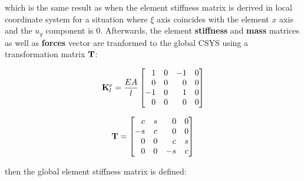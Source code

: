 which is the same result as when the element stiffness matrix is derived
in local coordinate system for a situation where $ \xi $ axis coincides with
the element $ x $ axis and the $ u_y $ component is $ 0 $. Afterwards,
the element \textbf{stiffness} and \textbf{mass} matrices as well as
\textbf{forces} vector are tranformed to the global CSYS using a transformation
matrix $ \mathbf{T} $:

\begin{equation}
    \mathbf{K}_l^e = \frac{EA}{l}
    \begin{bmatrix}
        \phantom{-}1 & 0 & -1 & 0 \\
        \phantom{-}0 & 0 & \phantom{-}0 & 0 \\
        -1 & 0 & \phantom{-}1 & 0 \\
        \phantom{-}0 & 0 & \phantom{-}0 & 0 \\
    \end{bmatrix}
\end{equation}

\begin{equation}
    \mathbf{T} = \begin{bmatrix}
        \phantom{-}c & s & \phantom{-}0 & 0 \\
        -s & c & \phantom{-}0 & 0 \\
        \phantom{-}0 & 0 & \phantom{-}c & s \\
        \phantom{-}0 & 0 & -s & c \\
    \end{bmatrix}
\end{equation}

then the global element stiffness matrix is defined:

